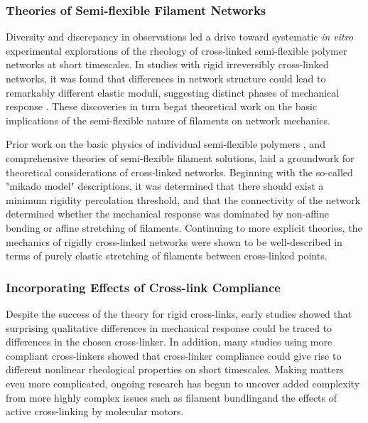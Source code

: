 \documentclass[pre,preprint]{revtex4-1}
\begin{document}
\subsubsection{Theories of Semi-flexible Filament Networks}
 
Diversity and discrepancy in observations led a drive toward systematic {\em in vitro} experimental explorations of the rheology of cross-linked semi-flexible polymer networks at short timescales.  In studies with rigid irreversibly cross-linked networks, it was found that differences in network structure could lead to remarkably different elastic moduli, suggesting distinct phases of mechanical response \cite{rheo_marge}.  These discoveries in turn begat theoretical work on the basic implications of the semi-flexible nature of filaments on network mechanics.  

Prior work on the basic physics of individual semi-flexible polymers \cite{mol_wlc,theo_doi_ed}, and comprehensive theories of semi-flexible filament solutions, \cite{theo_morse} laid a groundwork for theoretical considerations of cross-linked networks. Beginning with the so-called "mikado model" descriptions\cite{theo_hlm,theo_hlm2}, it was determined that there should exist a minimum rigidity percolation threshold, and that the connectivity of the network determined whether the mechanical response was dominated by non-affine bending or affine stretching of filaments.   Continuing to more explicit theories\cite{theo_best}, the mechanics of rigidly cross-linked networks were shown to be well-described in terms of purely elastic stretching of filaments between cross-linked points.  

\subsubsection{Incorporating Effects of Cross-link Compliance}

Despite the success of the theory for rigid cross-links, early studies showed that surprising qualitative differences in mechanical response could be traced to differences in the chosen cross-linker\cite{rheo_crosslinkcompare,rheo_crosslinkreview}.  In addition, many studies using more compliant cross-linkers showed that cross-linker compliance could give rise to different nonlinear rheological properties on short timescales\cite{rheo_crosslink_nonlin1,rheo_crosslink_nonlin2,rheo_crosslink_nonlin3,rheo_crosslink_notactin}. Making matters even more complicated, ongoing research has begun to uncover added complexity from more highly complex issues such as filament bundling\cite{theo_crosslinkslip2,model_massive}and the effects of active cross-linking by molecular motors\cite{rheo_active}.
\end{document}

